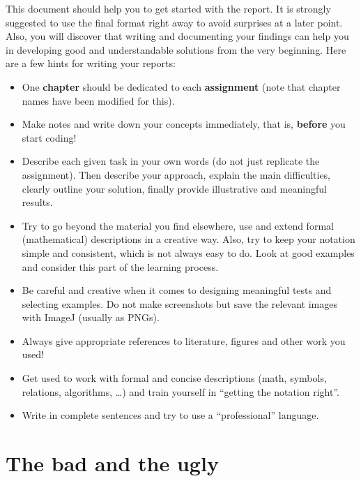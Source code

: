 This document should help you to get started with the report.
It is strongly suggested to use the final format right away to avoid
surprises at a later point. Also, you will discover that writing and documenting your findings  
can help you in developing good and understandable solutions from the very beginning.
Here are a few hints for writing your reports:
%
\begin{itemize}
\item
One \textbf{chapter} should be dedicated to each \textbf{assignment} (note that chapter names have been modified for this).
\item
Make notes and write down your concepts immediately, that is, \textbf{before} you start coding!
\item
Describe each given task in your own words (do not just replicate the assignment). 
Then describe your approach, explain the main difficulties, clearly outline your solution, finally 
provide illustrative and meaningful results. 
\item
Try to go beyond the material you find elsewhere, use and extend formal (mathematical) descriptions in a creative way. 
Also, try to keep your notation simple and consistent, which is not always easy to do. Look at good examples 
and consider this part of the learning process.
\item
Be careful and creative when it comes to designing meaningful tests and selecting examples.
Do not make screenshots but save the relevant images with ImageJ (usually as PNGs).
\item
Always give appropriate references to literature, figures and other work you used!
\item
Get used to work with formal and concise descriptions (math, symbols, relations, algorithms, \ldots) and train yourself in 
``getting the notation right''. 
\item 
Write in complete sentences and try to use a ``professional'' language.
\end{itemize}


\section*{The bad and the ugly}

